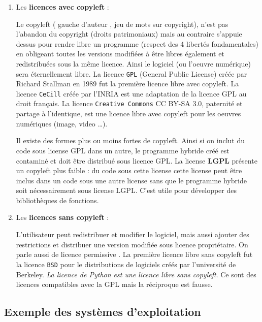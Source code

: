 \documentclass[
  11pt,
]{article}
\newcounter{prop}
\newcounter{def}
\newcounter{prog}
\newcounter{logi}
\begin{document}
\begin{enumerate}
\def\labelenumi{\arabic{enumi}.}
\item
  Les \textbf{licences avec copyleft} :

  Le copyleft ( gauche d'auteur , jeu de mots sur copyright), n'est pas
  l'abandon du copyright (droits patrimoniaux) mais au contraire
  s'appuie dessus pour rendre libre un programme (respect des 4 libertés
  fondamentales) en obligeant toutes les versions modifiées à être
  libres également et redistribuées sous la même licence. Ainsi le
  logiciel (ou l'oeuvre numérique) sera éternellement libre. La licence
  \texttt{GPL} (General Public License) créée par Richard Stallman en
  1989 fut la première licence libre avec copyleft. La licence
  \texttt{CeCill} créée par l'INRIA est une adaptation de la licence GPL
  au droit français. La licence \texttt{Creative\ Commons} CC BY-SA 3.0,
  paternité et partage à l'identique, est une licence libre avec
  copyleft pour les oeuvres numériques (image, video \ldots{}).

  Il existe des formes plus ou moins fortes de copyleft. Ainsi si on
  inclut du code sous license GPL dans un autre, le programme hybride
  créé est contaminé et doit être distribué sous licence GPL. La license
  \textbf{LGPL} présente un copyleft plus faible : du code sous cette
  license cette license peut être inclus dans un code sous une autre
  license sans que le programme hybride soit nécessairement sous license
  LGPL. C'est utile pour développer des bibliothèques de fonctions.
\item
  Les \textbf{licences sans copyleft} :

  L'utilisateur peut redistribuer et modifier le logiciel, mais aussi
  ajouter des restrictions et distribuer une version modifiée sous
  licence propriétaire. On parle aussi de licence permissive . La
  première licence libre sans copyleft fut la licence \texttt{BSD} pour
  le distributions de logiciels créés par l'université de Berkeley.
  \emph{La licence de Python est une licence libre sans copyleft}. Ce
  sont des licences compatibles avec la GPL mais la réciproque est
  fausse.
\end{enumerate}

\hypertarget{exemple-des-systuxe8mes-dexploitation}{%
\subsection{Exemple des systèmes
d'exploitation}\label{exemple-des-systuxe8mes-dexploitation}}
\end{document}
